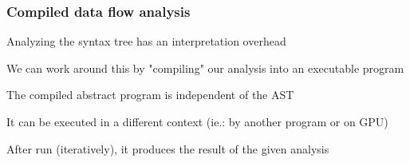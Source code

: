 \documentclass[bigger]{beamer}
\begin{document}
\begin{frame}
\frametitle{Compiled data flow analysis}

\begin{vfitemize}
	\item Analyzing the syntax tree has an interpretation overhead
	\item We can work around this by "compiling" our analysis into an executable program
	\item The compiled abstract program is independent of the AST
	\item It can be executed in a different context (ie.: by another program or on GPU)
	\item After run (iteratively), it produces the result of the given analysis
\end{vfitemize}
\end{frame}
\end{document}
